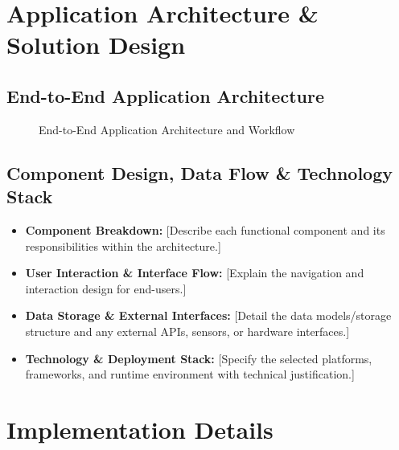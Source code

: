\documentclass[11pt, a4paper]{article}
\begin{document}
\section{Application Architecture \& Solution Design}

\subsection{End-to-End Application Architecture}

\begin{figure}[H]
    \centering
    \caption{End-to-End Application Architecture and Workflow}
\end{figure}

\subsection{Component Design, Data Flow \& Technology Stack}
\begin{itemize}[noitemsep, topsep=2pt]
    \item \textbf{Component Breakdown:} {[Describe each functional component and its responsibilities within the architecture.]}
    \item \textbf{User Interaction \& Interface Flow:} {[Explain the navigation and interaction design for end-users.]}
    \item \textbf{Data Storage \& External Interfaces:} {[Detail the data models/storage structure and any external APIs, sensors, or hardware interfaces.]}
    \item \textbf{Technology \& Deployment Stack:} {[Specify the selected platforms, frameworks, and runtime environment with technical justification.]}
\end{itemize}

\section{Implementation Details}
\end{document}
